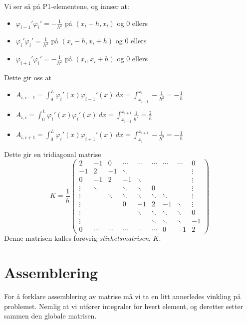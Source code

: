 \documentclass[a4paper, 10pt]{article}
\begin{document}
Vi ser så på P1-elementene, og innser at:
\begin{itemize}
\item $\varphi_{i-1}'\varphi_i' = -\frac{1}{h^2}$ på $(x_i-h, x_i)$ og $0$ ellers
\item $\varphi_{i}'\varphi_i' = \frac{1}{h^2}$ på $(x_i-h, x_i+h)$ og $0$ ellers
\item $\varphi_{i+1}'\varphi_i' = -\frac{1}{h^2}$ på $(x_i, x_i+h)$ og $0$ ellers
\end{itemize}
Dette gir oss at
\begin{itemize}
\item $A_{i, i-1} = \int_0^L \varphi_i'(x)\varphi_{i-1}'(x) \ dx = \int_{x_{i-1}}^{x_i} -\frac{1}{h^2} = -\frac{1}{h}$
\item $A_{i, i} = \int_0^L \varphi_i'(x)\varphi_i'(x) \ dx = \int_{x_{i-1}}^{x_{i+1}} \frac{1}{h^2} = \frac{2}{h}$
\item $A_{i, i+1} = \int_0^L \varphi_i'(x)\varphi_{i+1}'(x) \ dx = \int_{x_{i}}^{x_{i+1}} -\frac{1}{h^2} = -\frac{1}{h}$
\end{itemize}
Dette gir en tridiagonal matrise
\begin{equation}
K = \frac{1}{h}\left(
	\begin{array}{ccccccccc}
2 & -1 & 0
&\cdots &
\cdots & \cdots & \cdots &
\cdots & 0 \\ 
-1 & 2 & -1 & \ddots &   & &  & &  \vdots \\ 
0 & -1 & 2 & -1 &
\ddots & &  &  & \vdots \\ 
\vdots & \ddots &  & \ddots & \ddots & 0 &  & & \vdots \\ 
\vdots &  & \ddots & \ddots & \ddots & \ddots & \ddots & & \vdots \\ 
\vdots & &  & 0 & -1 & 2 & -1 & \ddots & \vdots \\ 
\vdots & & &  & \ddots & \ddots & \ddots &\ddots  & 0 \\ 
\vdots & & & &  &\ddots  & \ddots &\ddots  & -1 \\ 
0 &\cdots & \cdots &\cdots & \cdots & \cdots  & 0 & -1 & 2
\end{array}
\right)
\end{equation}
Denne matrisen kalles forøvrig \emph{stivhetsmatrisen}, $K$.
\section{Assemblering}
For å forklare assemblering av matrise må vi ta en litt annerledes vinkling på problemet. Nemlig at vi utfører integraler for hvert element, og deretter setter sammen den globale matrisen.
\end{document}
